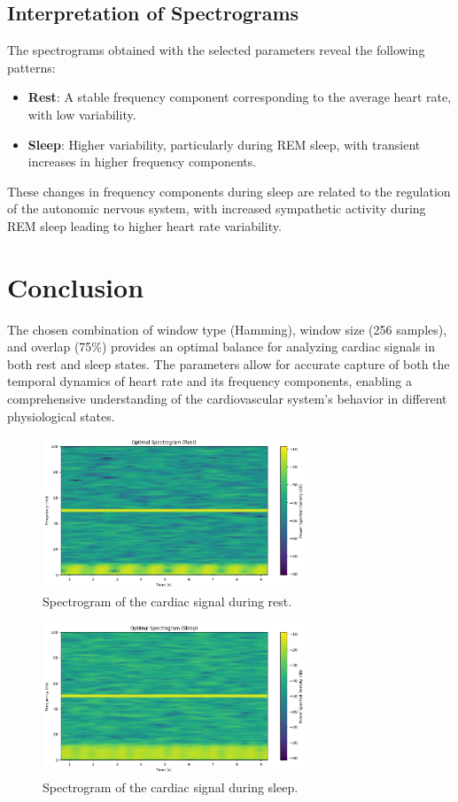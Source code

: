 \documentclass[10pt]{article}
\theoremstyle{definition}
\theoremstyle{remark}
\theoremstyle{definition}
\numberwithin{equation}{prob}
\begin{document}
\subsection{Interpretation of Spectrograms}

The spectrograms obtained with the selected parameters reveal the following patterns:
\begin{itemize}
    \item \textbf{Rest}: A stable frequency component corresponding to the average heart rate, with low variability.
    \item \textbf{Sleep}: Higher variability, particularly during REM sleep, with transient increases in higher frequency components.
\end{itemize}

These changes in frequency components during sleep are related to the regulation of the autonomic nervous system, with increased sympathetic activity during REM sleep leading to higher heart rate variability.

\section*{Conclusion}

The chosen combination of window type (Hamming), window size (256 samples), and overlap (75\%) provides an optimal balance for analyzing cardiac signals in both rest and sleep states. The parameters allow for accurate capture of both the temporal dynamics of heart rate and its frequency components, enabling a comprehensive understanding of the cardiovascular system's behavior in different physiological states.

\begin{figure}[h]
    \centering
    \includegraphics[width=0.7\textwidth]{./figures/Optimal Spectrogram (Rest).png}
    \caption{Spectrogram of the cardiac signal during rest.}
\end{figure}

\begin{figure}[h]
    \centering
    \includegraphics[width=0.7\textwidth]{./figures/Optimal Spectrogram (Sleep).png}
    \caption{Spectrogram of the cardiac signal during sleep.}
\end{figure}
\end{document}
